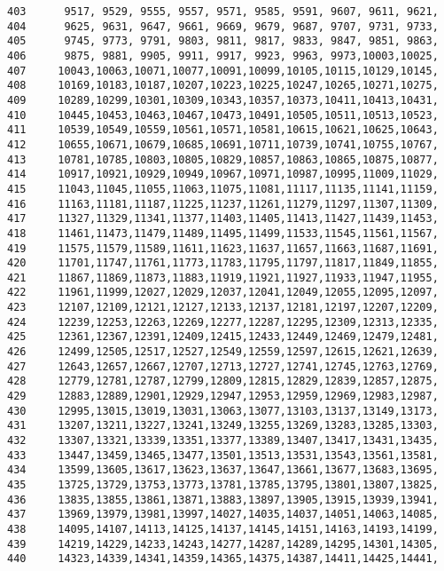 \begin{Code}
\begin{verbatim}
403      9517, 9529, 9555, 9557, 9571, 9585, 9591, 9607, 9611, 9621,
404      9625, 9631, 9647, 9661, 9669, 9679, 9687, 9707, 9731, 9733,
405      9745, 9773, 9791, 9803, 9811, 9817, 9833, 9847, 9851, 9863,
406      9875, 9881, 9905, 9911, 9917, 9923, 9963, 9973,10003,10025,
407     10043,10063,10071,10077,10091,10099,10105,10115,10129,10145,
408     10169,10183,10187,10207,10223,10225,10247,10265,10271,10275,
409     10289,10299,10301,10309,10343,10357,10373,10411,10413,10431,
410     10445,10453,10463,10467,10473,10491,10505,10511,10513,10523,
411     10539,10549,10559,10561,10571,10581,10615,10621,10625,10643,
412     10655,10671,10679,10685,10691,10711,10739,10741,10755,10767,
413     10781,10785,10803,10805,10829,10857,10863,10865,10875,10877,
414     10917,10921,10929,10949,10967,10971,10987,10995,11009,11029,
415     11043,11045,11055,11063,11075,11081,11117,11135,11141,11159,
416     11163,11181,11187,11225,11237,11261,11279,11297,11307,11309,
417     11327,11329,11341,11377,11403,11405,11413,11427,11439,11453,
418     11461,11473,11479,11489,11495,11499,11533,11545,11561,11567,
419     11575,11579,11589,11611,11623,11637,11657,11663,11687,11691,
420     11701,11747,11761,11773,11783,11795,11797,11817,11849,11855,
421     11867,11869,11873,11883,11919,11921,11927,11933,11947,11955,
422     11961,11999,12027,12029,12037,12041,12049,12055,12095,12097,
423     12107,12109,12121,12127,12133,12137,12181,12197,12207,12209,
424     12239,12253,12263,12269,12277,12287,12295,12309,12313,12335,
425     12361,12367,12391,12409,12415,12433,12449,12469,12479,12481,
426     12499,12505,12517,12527,12549,12559,12597,12615,12621,12639,
427     12643,12657,12667,12707,12713,12727,12741,12745,12763,12769,
428     12779,12781,12787,12799,12809,12815,12829,12839,12857,12875,
429     12883,12889,12901,12929,12947,12953,12959,12969,12983,12987,
430     12995,13015,13019,13031,13063,13077,13103,13137,13149,13173,
431     13207,13211,13227,13241,13249,13255,13269,13283,13285,13303,
432     13307,13321,13339,13351,13377,13389,13407,13417,13431,13435,
433     13447,13459,13465,13477,13501,13513,13531,13543,13561,13581,
434     13599,13605,13617,13623,13637,13647,13661,13677,13683,13695,
435     13725,13729,13753,13773,13781,13785,13795,13801,13807,13825,
436     13835,13855,13861,13871,13883,13897,13905,13915,13939,13941,
437     13969,13979,13981,13997,14027,14035,14037,14051,14063,14085,
438     14095,14107,14113,14125,14137,14145,14151,14163,14193,14199,
439     14219,14229,14233,14243,14277,14287,14289,14295,14301,14305,
440     14323,14339,14341,14359,14365,14375,14387,14411,14425,14441,

\end{verbatim}
\end{Code}
